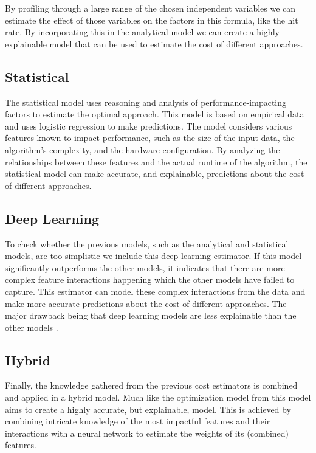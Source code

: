 By profiling through a large range of the chosen independent variables we can estimate the effect of those variables on the factors in this formula, like the hit rate. By incorporating this in the analytical model we can create a highly explainable model that can be used to estimate the cost of different approaches.

\subsection{Statistical}
The statistical model uses reasoning and analysis of performance-impacting factors to estimate the optimal approach. This model is based on empirical data and uses logistic regression to make predictions. The model considers various features known to impact performance, such as the size of the input data, the algorithm's complexity, and the hardware configuration. By analyzing the relationships between these features and the actual runtime of the algorithm, the statistical model can make accurate, and explainable, predictions about the cost of different approaches.

\subsection{Deep Learning}
To check whether the previous models, such as the analytical and statistical models, are too simplistic we include this deep learning estimator. If this model significantly outperforms the other models, it indicates that there are more complex feature interactions happening which the other models have failed to capture. This estimator can model these complex interactions from the data and make more accurate predictions about the cost of different approaches. The major drawback being that deep learning models are less explainable than the other models \cite{explainable-deep-learning}.

\subsection{Hybrid}
Finally, the knowledge gathered from the previous cost estimators is combined and applied in a hybrid model. Much like the optimization model from \cite{halide_cost_model} this model aims to create a highly accurate, but explainable, model. This is achieved by combining intricate knowledge of the most impactful features and their interactions with a neural network to estimate the weights of its (combined) features.

